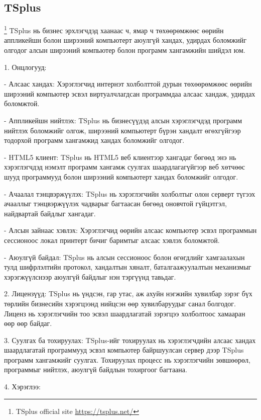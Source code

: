 \pagebreak

\subsection{TSplus}
\footnote{TSplus official site \url{https://tsplus.net/}}
	\quad \quad TSplus нь бизнес эрхлэгчдэд хаанаас ч, ямар ч төхөөрөмжөөс өөрийн аппликейшн болон ширээний компьютерт аюулгүй хандах, удирдах боломжийг олгодог алсын ширээний компьютер болон программ хангамжийн шийдэл юм.

1. Онцлогууд: 

- Алсаас хандах: Хэрэглэгчид интернэт холболттой дурын төхөөрөмжөөс өөрийн ширээний компьютер эсвэл виртуалчлагдсан программдаа алсаас хандаж, удирдах боломжтой.

- Аппликейшн нийтлэх: TSplus нь бизнесүүдэд алсын хэрэглэгчдэд программ нийтлэх боломжийг олгож, ширээний компьютерт бүрэн хандалт өгөхгүйгээр тодорхой программ хангамжид хандах боломжийг олгодог.

- HTML5 клиент: TSplus нь HTML5 веб клиентээр хангадаг бөгөөд энэ нь хэрэглэгчдэд нэмэлт программ хангамж суулгах шаардлагагүйгээр веб хөтчөөс шууд программууд болон ширээний компьютерт хандах боломжийг олгодог.

- Ачаалал тэнцвэржүүлэх: TSplus нь хэрэглэгчийн холболтыг олон серверт түгээх ачааллыг тэнцвэржүүлэх чадварыг багтаасан бөгөөд оновчтой гүйцэтгэл, найдвартай байдлыг хангадаг.

- Алсын зайнаас хэвлэх: Хэрэглэгчид өөрийн алсаас компьютер эсвэл программын сессионоос локал принтерт бичиг баримтыг алсаас хэвлэх боломжтой.

- Аюулгүй байдал: TSplus нь алсын сессионоос болон өгөгдлийг хамгаалахын тулд шифрлэлтийн протокол, хандалтын хяналт, баталгаажуулалтын механизмыг хэрэгжүүлснээр аюулгүй байдлыг нэн тэргүүнд тавьдаг.

2. Лицензүүд: TSplus нь үндсэн, гар утас, аж ахуйн нэгжийн хувилбар зэрэг бүх төрлийн бизнесийн хэрэгцээнд нийцсэн өөр хувилбаруудыг санал болгодог. Лиценз нь хэрэглэгчийн тоо эсвэл шаардлагатай зэрэгцээ холболтоос хамааран өөр өөр байдаг.

3. Суулгах ба тохируулах: TSplus-ийг тохируулах нь хэрэглэгчдийн алсаас хандах шаардлагатай программууд эсвэл компьютер байршуулсан сервер дээр TSplus программ хангамжийг суулгах. Тохируулах процесс нь хэрэглэгчийн зөвшөөрөл, программыг нийтлэх, аюулгүй байдлын тохиргоог багтаана. 

4. Хэрэглээ: 


